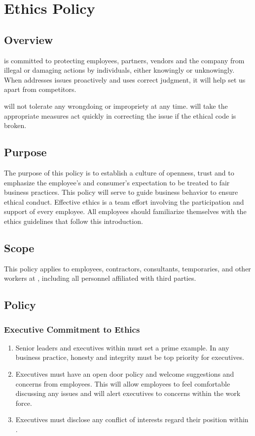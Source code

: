 \chapter{Ethics Policy}\label{G:EtP}
\CommonIntroduction
\section{Overview}
\CompanyName{} is committed to protecting employees, partners, vendors and the company from illegal or damaging actions by individuals, either knowingly or unknowingly.  
When \CompanyName{} addresses issues proactively and uses correct judgment, it will help set us apart from competitors.

\CompanyName{} will not tolerate any wrongdoing or impropriety at any time.  
\CompanyName{} will take the appropriate measures act quickly in correcting the issue if the ethical code is broken.  
\section{Purpose}
The purpose of this policy is to establish a culture of openness, trust\oxford{} and to emphasize the employee's and consumer's expectation to be treated to fair business practices.  
This policy will serve to guide business behavior to ensure ethical conduct.  
Effective ethics is a team effort involving the participation and support of every \CompanyName{} employee.  
All employees should familiarize themselves with the ethics guidelines that follow this introduction.
\section{Scope}
This policy applies to employees, contractors, consultants, temporaries, and other workers at \CompanyName{}, including all personnel affiliated with third parties.
\section{Policy}
\subsection{Executive Commitment to Ethics}
\begin{enumerate}
\item 
Senior leaders and executives within \CompanyName{} must set a prime example.  
In any business practice, honesty and integrity must be top priority for executives.
\item 
Executives must have an open door policy and welcome suggestions and concerns from employees.  
This will allow employees to feel comfortable discussing any issues and will alert executives to concerns within the work force.
\item
Executives must disclose any conflict of interests regard their position within \CompanyName{}.
\end{enumerate}
